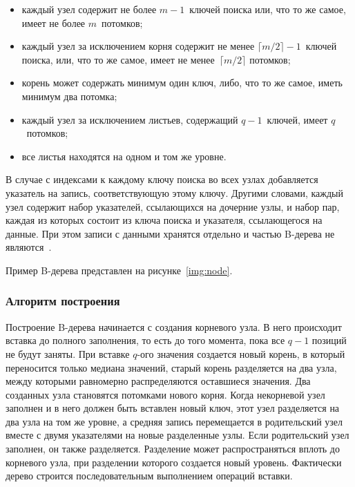 \begin{itemize}
    \item каждый узел содержит не более $m - 1$~ключей поиска или, что то же
        самое, имеет не более $m$~потомков;

    \item каждый узел за исключением корня содержит не менее $\lceil m / 2
        \rceil - 1$~ключей поиска, или, что то же самое, имеет не менее~$\lceil
        m / 2 \rceil$ потомков;

    \item корень может содержать минимум один ключ, либо, что то же самое, иметь
        минимум два потомка;

    \item каждый узел за исключением листьев, содержащий $q-1$~ключей, имеет
        $q$~потомков;

    \item все листья находятся на одном и том же уровне.
\end{itemize}

В случае с индексами к каждому ключу поиска во всех узлах добавляется указатель
на запись, соответствующую этому ключу. Другими словами, каждый узел содержит
набор указателей, ссылающихся на дочерние узлы, и набор пар, каждая из которых
состоит из ключа поиска и указателя, ссылающегося на данные. При этом записи с
данными хранятся отдельно и частью B-дерева не являются~\cite{arki}.

Пример B-дерева представлен на рисунке~\ref{img:node}.


\subsubsection{Алгоритм построения}

Построение B-дерева начинается с создания корневого узла. В него происходит
вставка до полного заполнения, то есть до того момента, пока все $q-1$ позиций
не будут заняты. При вставке $q$-ого значения создается новый корень, в который
переносится только медиана значений, старый корень разделяется на два узла,
между которыми равномерно распределяются оставшиеся значения. Два созданных узла
становятся потомками нового корня. Когда некорневой узел заполнен и в него
должен быть вставлен новый ключ, этот узел разделяется на два узла на том же
уровне, а средняя запись перемещается в родительский узел вместе с двумя
указателями на новые разделенные узлы. Если родительский узел заполнен, он также
разделяется. Разделение может распространяться вплоть до корневого узла, при
разделении которого создается новый уровень. Фактически дерево строится
последовательным выполнением операций вставки.

